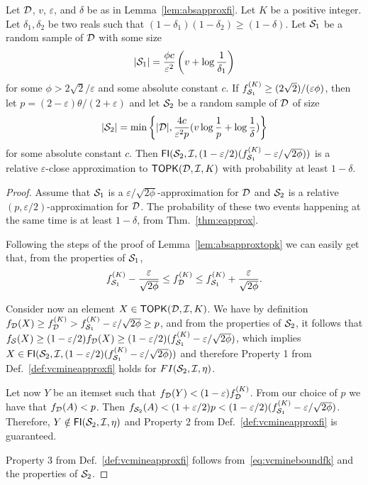 \begin{lemma}\label{lem:relapproxtopk}
  Let ${\cal D}$, $v$, $\varepsilon$, and $\delta$ be as in Lemma~\ref{lem:absapproxfi}.
  Let $K$ be a positive integer. Let $\delta_1,\delta_2$ be two reals such that
  $(1-\delta_1)(1-\delta_2)\ge(1-\delta)$. Let ${\cal S}_1$ be a random sample of
  ${\cal D}$ with some size
  \[
  |{\cal S}_1|=\frac{\phi c}{\varepsilon^2}\left(v+\log\frac{1}{\delta_1}\right)\]
  for some $\phi>2\sqrt{2}/\varepsilon$ and some absolute constant $c$. If
  $f_{{\cal S}_1}^{(K)}\ge (2\sqrt{2})/(\varepsilon\phi)$, then let
  $p=(2-\varepsilon)\theta/(2+\varepsilon)$ and let ${\cal S}_2$ be
  a random sample of ${\cal D}$ of size 
  \[ |{\cal S}_2|=\min\left\{|{\cal D}|,
  \frac{4c}{\varepsilon^2p}(v\log\frac{1}{p} + \log\frac{1}{\delta})\right\}\]
  for some
  absolute constant $c$. Then
  $\mathsf{FI}({\cal S}_2,{\cal I},(1-\varepsilon/2)(f_{{\cal S}_1}^{(K)}-\varepsilon/\sqrt{2\phi}))$
  is a relative $\varepsilon$-close approximation to $\mathsf{TOPK}({\cal D},{\cal I},K)$ with
  probability at least $1-\delta$.
\end{lemma}

\begin{proof}
  Assume that ${\cal S}_1$ is a $\varepsilon/\sqrt{2\phi}$-approximation for
  ${\cal D}$ and ${\cal S}_2$ is a relative $(p,\varepsilon/2)$-approximation for ${\cal D}$.
  The probability of these two events happening at the same time is at least
  $1-\delta$, from Thm.~\ref{thm:eapprox}.

  Following the steps of the proof of Lemma~\ref{lem:absapproxtopk} we can
  easily get that, from the properties of ${\cal S}_1$,
  \begin{equation}\label{eq:vcmineboundfk}
    f_{{\cal S}_1}^{(K)}-\frac{\varepsilon}{\sqrt{2\phi}}\le f_{\cal D}^{(K)}\le
    f_{{\cal S}_1}^{(K)}+\frac{\varepsilon}{\sqrt{2\phi}}.
  \end{equation}

  Consider now an element $X\in\mathsf{TOPK}({\cal D},{\cal I},K)$. We have by definition
  $f_{\cal D}(X)\ge f_{\cal D}^{(K)} > f_{{\cal S}_1}^{(K)}-\varepsilon/\sqrt{2\phi}\ge
  p$, and from the properties of ${\cal S}_2$, it follows that $f_{\cal S}(X)\ge
  (1-\varepsilon/2)f_{\cal D}(X)\ge(1-\varepsilon/2)(f_{{\cal S}_1}^{(K)}-\varepsilon/\sqrt{2\phi})$,
  which implies
  $X\in\mathsf{FI}({\cal S}_2,{\cal I},(1-\varepsilon/2)(f_{{\cal S}_1}^{(K)}-\varepsilon/\sqrt{2\phi}))$
  and therefore Property 1 from Def.~\ref{def:vcmineapproxfi} holds for
  $FI({\cal S}_2,{\cal I},\eta)$.
 
  Let now $Y$ be an itemset such that $f_{\cal D}(Y)<(1-\varepsilon)f_{\cal D}^{(K)}$.
  From our choice of $p$ we have that $f_{\cal D}(A)< p$. Then
  $f_{{\cal S}_2}(A)<(1+\varepsilon/2)p<(1-\varepsilon/2)(f_{{\cal S}_1}^{(K)}-\varepsilon/\sqrt{2\phi})$.
  Therefore, $Y\notin\mathsf{FI}({\cal S}_2,{\cal I},\eta)$ and Property 2 from
  Def.~\ref{def:vcmineapproxfi} is guaranteed.

  Property 3 from Def.~\ref{def:vcmineapproxfi} follows from~\eqref{eq:vcmineboundfk} and
  the properties of ${\cal S}_2$.
\end{proof}

